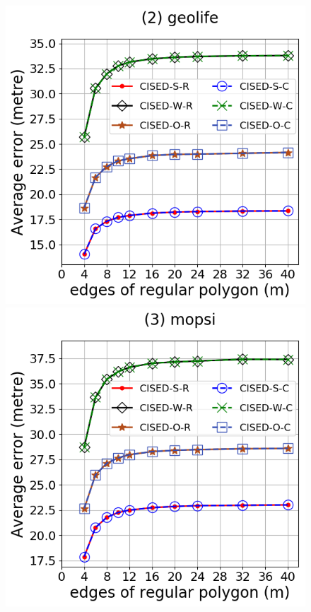 \begin{figure}[tb!]
	\includegraphics[scale = 0.30]{Figures/Exp-M-e-60-error-geolife.png}
	\includegraphics[scale = 0.30]{Figures/Exp-M-e-60-error-mopsi.png}

\end{figure}
